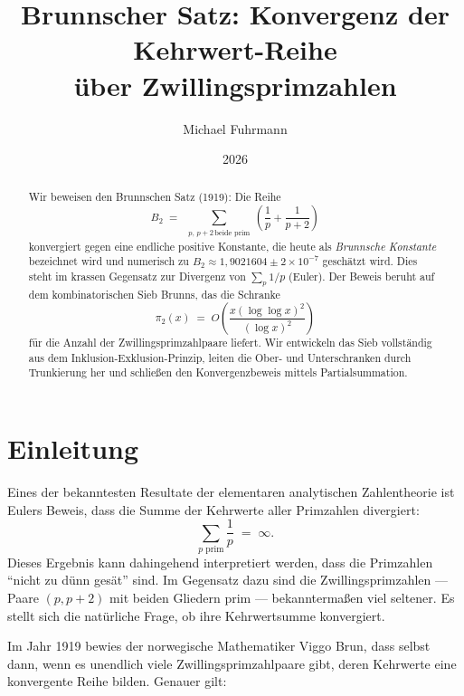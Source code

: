 \documentclass[12pt,a4paper]{amsart}
\theoremstyle{definition}
\begin{document}

\title{Brunnscher Satz: Konvergenz der Kehrwert-Reihe\\über Zwillingsprimzahlen}

\author{Michael Fuhrmann}
\address{Specialist Mathematics Project, Build 74}
\date{2026}

\begin{abstract}
Wir beweisen den Brunnschen Satz (1919): Die Reihe
\[
  B_2 \;=\; \sum_{\substack{p,\,p+2\,\text{beide prim}}}
             \left(\frac{1}{p}+\frac{1}{p+2}\right)
\]
konvergiert gegen eine endliche positive Konstante, die heute als
\emph{Brunnsche Konstante} bezeichnet wird und numerisch zu
$B_2 \approx 1{,}9021604 \pm 2\times 10^{-7}$ geschätzt wird.
Dies steht im krassen Gegensatz zur Divergenz von $\sum_p 1/p$
(Euler).  Der Beweis beruht auf dem kombinatorischen Sieb Brunns,
das die Schranke
\[
  \pi_2(x) \;=\; O\!\left(\frac{x(\log\log x)^2}{(\log x)^2}\right)
\]
für die Anzahl der Zwillingsprimzahlpaare liefert.  Wir entwickeln
das Sieb vollständig aus dem Inklusion-Exklusion-Prinzip, leiten die
Ober- und Unterschranken durch Trunkierung her und schließen den
Konvergenzbeweis mittels Partialsummation.
\end{abstract}

\maketitle
\tableofcontents

\section{Einleitung}

Eines der bekanntesten Resultate der elementaren analytischen Zahlentheorie
ist Eulers Beweis, dass die Summe der Kehrwerte aller Primzahlen divergiert:
\[
  \sum_{p \text{ prim}} \frac{1}{p} \;=\; \infty.
\]
Dieses Ergebnis kann dahingehend interpretiert werden, dass die Primzahlen
``nicht zu dünn gesät'' sind.  Im Gegensatz dazu sind die Zwillingsprimzahlen
--- Paare $(p, p+2)$ mit beiden Gliedern prim --- bekanntermaßen viel seltener.
Es stellt sich die natürliche Frage, ob ihre Kehrwertsumme konvergiert.

Im Jahr 1919 bewies der norwegische Mathematiker Viggo Brun, dass selbst dann,
wenn es unendlich viele Zwillingsprimzahlpaare gibt, deren Kehrwerte eine
konvergente Reihe bilden.  Genauer gilt:
\end{document}

